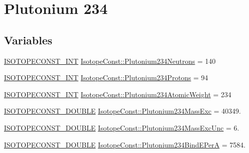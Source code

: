 \hypertarget{group___isotope_const-_plutonium-_pu234}{}\section{Plutonium 234}
\label{group___isotope_const-_plutonium-_pu234}
\subsection*{Variables}
\begin{DoxyCompactItemize}
\item 
\mbox{\hyperlink{group___isotope_const-_macros_ga5f18360b3e99483a35c32d789e62621c}{I\+S\+O\+T\+O\+P\+E\+C\+O\+N\+S\+T\+\_\+\+I\+NT}} \mbox{\hyperlink{group___isotope_const-_plutonium-_pu234_ga95052558585c570a3fd1d061cbd0d53b}{Isotope\+Const\+::\+Plutonium234\+Neutrons}} = 140
\item 
\mbox{\hyperlink{group___isotope_const-_macros_ga5f18360b3e99483a35c32d789e62621c}{I\+S\+O\+T\+O\+P\+E\+C\+O\+N\+S\+T\+\_\+\+I\+NT}} \mbox{\hyperlink{group___isotope_const-_plutonium-_pu234_ga4eff41039c6f70f51f7a8a9a2a5fd4fe}{Isotope\+Const\+::\+Plutonium234\+Protons}} = 94
\item 
\mbox{\hyperlink{group___isotope_const-_macros_ga5f18360b3e99483a35c32d789e62621c}{I\+S\+O\+T\+O\+P\+E\+C\+O\+N\+S\+T\+\_\+\+I\+NT}} \mbox{\hyperlink{group___isotope_const-_plutonium-_pu234_ga6876aa007cfc7ad61122c049ca100d08}{Isotope\+Const\+::\+Plutonium234\+Atomic\+Weight}} = 234
\item 
\mbox{\hyperlink{group___isotope_const-_macros_ga8f45a7272ce02c0b4c65c44636ed719a}{I\+S\+O\+T\+O\+P\+E\+C\+O\+N\+S\+T\+\_\+\+D\+O\+U\+B\+LE}} \mbox{\hyperlink{group___isotope_const-_plutonium-_pu234_gabefa0634ad2f6861d7a156d2fa74ba4c}{Isotope\+Const\+::\+Plutonium234\+Mass\+Exc}} = 40349.
\item 
\mbox{\hyperlink{group___isotope_const-_macros_ga8f45a7272ce02c0b4c65c44636ed719a}{I\+S\+O\+T\+O\+P\+E\+C\+O\+N\+S\+T\+\_\+\+D\+O\+U\+B\+LE}} \mbox{\hyperlink{group___isotope_const-_plutonium-_pu234_ga6198ab6b4402b889d36f1cd80f3251d0}{Isotope\+Const\+::\+Plutonium234\+Mass\+Exc\+Unc}} = 6.
\item 
\mbox{\hyperlink{group___isotope_const-_macros_ga8f45a7272ce02c0b4c65c44636ed719a}{I\+S\+O\+T\+O\+P\+E\+C\+O\+N\+S\+T\+\_\+\+D\+O\+U\+B\+LE}} \mbox{\hyperlink{group___isotope_const-_plutonium-_pu234_gadd4b3dfb0027caa81389e44b242eeca8}{Isotope\+Const\+::\+Plutonium234\+Bind\+E\+PerA}} = 7584.
\item 

\end{DoxyCompactItemize}
